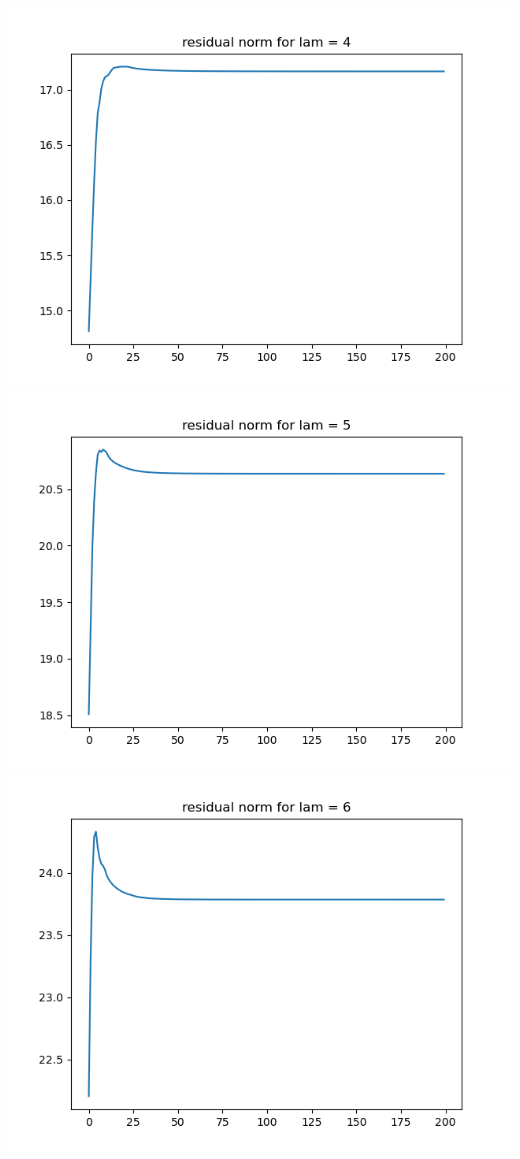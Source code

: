 \documentclass{article}
\begin{document}
\begin{enumerate}
\begin{enumerate}
\begin{center}
			\includegraphics[scale=.3]{hw7p1b residual norm for lamcount = 9}
			\includegraphics[scale=.3]{hw7p1b residual norm for lamcount = 10}
			\includegraphics[scale=.3]{hw7p1b residual norm for lamcount = 11}

\end{center}
\end{enumerate}
\end{enumerate}
\end{document}
